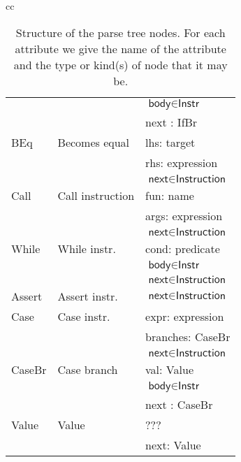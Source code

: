 \documentclass{article}
\begin{document}
\begin{table}
\begin{center}
\begin{tabular}[t]{cc}
\begin{tabular}[t]{|l|l|l|}
        & & $\textsf{body} \in \textsf{Instr}$ \\
        & & \textsf{next} : \textsf{IfBr} \\
        \hline
        \textsf{BEq} & Becomes equal & \textsf{lhs}: target \\
        & & \textsf{rhs}: expression \\
        & & $\textsf{next} \in \textsf{Instruction}$ \\
        \hline
        \textsf{Call} & Call instruction & \textsf{fun}: name \\
        & & \textsf{args}: expression \\
        & & $\textsf{next} \in \textsf{Instruction}$ \\
        \hline
        \textsf{While} & While instr. & \textsf{cond}: predicate \\
        & & $\textsf{body} \in \textsf{Instr}$ \\
        & & $\textsf{next} \in \textsf{Instruction}$ \\
        \hline
        \textsf{Assert} & Assert instr. & $\textsf{next} \in \textsf{Instruction}$ \\
        \hline
        \textsf{Case} & Case instr. & \textsf{expr}: expression\\
        & & \textsf{branches}: \textsf{CaseBr} \\
        & & $\textsf{next} \in \textsf{Instruction}$ \\
        \hline
        \textsf{CaseBr} & Case branch & \textsf{val}: \textsf{Value} \\
        & & $\textsf{body} \in \textsf{Instr}$ \\
        & & \textsf{next} : \textsf{CaseBr} \\
        \hline
        \textsf{Value} & Value & ??? \\
        & & \textsf{next}: \textsf{Value} \\
        \hline
      \end{tabular} \\
      \\
       \\
    \end{tabular}
    \caption{Structure of the parse tree nodes. For each attribute we give the name of the attribute and
    the type or kind(s) of node that it may be.}
    \label{tab:node-attr}
  \end{center}
\end{table}
\end{document}
